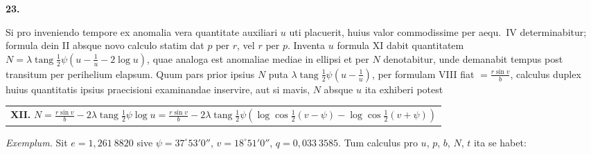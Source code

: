 \documentclass[12pt,a4paper]{book}
\newcommand{\tang}{\operatorname{tang}}
\begin{document}
\textbf{23.}

Si pro inveniendo tempore ex anomalia vera quantitate auxiliari $u$ uti placuerit, huius valor commodissime per aequ.~IV determinabitur; formula dein II absque novo calculo statim dat $p$ per $r$, vel $r$ per $p$. Inventa $u$ formula XI dabit quantitatem $N=\lambda\tang\tfrac{1}{2}\psi(u-\frac{1}{u}-2\log u)$, quae analoga est anomaliae mediae in ellipsi et per $N$ denotabitur, unde demanabit tempus post transitum per perihelium elapsum. Quum pars prior ipsius $N$ puta $\lambda\tang\tfrac{1}{2}\psi(u-\frac{1}{u})$, per formulam VIII fiat $=\frac{r\sin v}{b}$, calculus duplex huius quantitatis ipsius praecisioni examinandae inservire, aut si mavis, $N$ absque $u$ ita exhiberi potest

\begin{center}
\begin{tabular}{@{}l@{}}
\textbf{XII.} $N=\frac{r\sin v}{b}-2\lambda\tang\tfrac{1}{2}\psi\log u=\frac{r\sin v}{b}-2\lambda\tang\tfrac{1}{2}\psi(\log\cos\tfrac{1}{2}(v-\psi)-\log\cos\tfrac{1}{2}(v+\psi))$
\end{tabular}
\end{center}

\textit{Exemplum.} Sit $e=1{,}261\ 8820$ sive $\psi=37^{\circ}53'0''$, $v=18^{\circ}51'0''$, $q=0{,}033\ 3585$. Tum calculus pro $u$, $p$, $b$, $N$, $t$ ita se habet:
\end{document}
